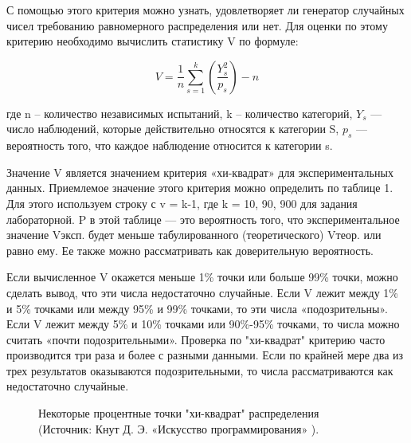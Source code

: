 \documentclass[14pt, a4paper]{extarticle}
\begin{document}
С помощью этого критерия можно узнать, удовлетворяет ли генератор случайных чисел требованию равномерного распределения или нет. 
Для оценки по этому критерию необходимо вычислить статистику V по формуле:

\begin{equation}
    V = \frac{1}{n} \sum_{s = 1}^k (\frac{Y_{s}^2}{p_{s}}) - n
\end{equation}

где n – количество независимых испытаний, k – количество категорий, $Y_{s}$ — число наблюдений, которые действительно относятся к категории S, $p_{s}$ — вероятность того, что каждое наблюдение относится к категории s.  

Значение V является значением критерия «хи-квадрат» для экспериментальных данных. Приемлемое значение этого критерия можно определить по таблице 1. Для этого используем строку с v = k-1, где k = 10, 90, 900 для задания лабораторной.  P в этой таблице — это вероятность того, что экспериментальное значение Vэксп. будет меньше табулированного (теоретического) Vтеор. или равно ему. Ее также можно рассматривать как доверительную вероятность.

Если вычисленное V окажется меньше 1\% точки или больше 99\% точки, можно сделать вывод, что эти числа недостаточно случайные. Если V лежит между 1\% и 5\% точками или между 95\% и 99\% точками, то эти числа «подозрительны». Если V лежит между 5\% и 10\% точками или 90\%-95\% точками, то числа можно считать «почти подозрительными». Проверка по "хи-квадрат" критерию часто производится три раза и более с разными данными. Если по крайней мере два из трех результатов оказываются подозрительными, то числа рассматриваются как недостаточно случайные.

\begin{figure}[H]
\caption{Некоторые процентные точки "хи-квадрат" распределения (Источник: Кнут Д. Э. «Искусство программирования» ).}
\label{fig:table}
\end{figure}
\end{document}
